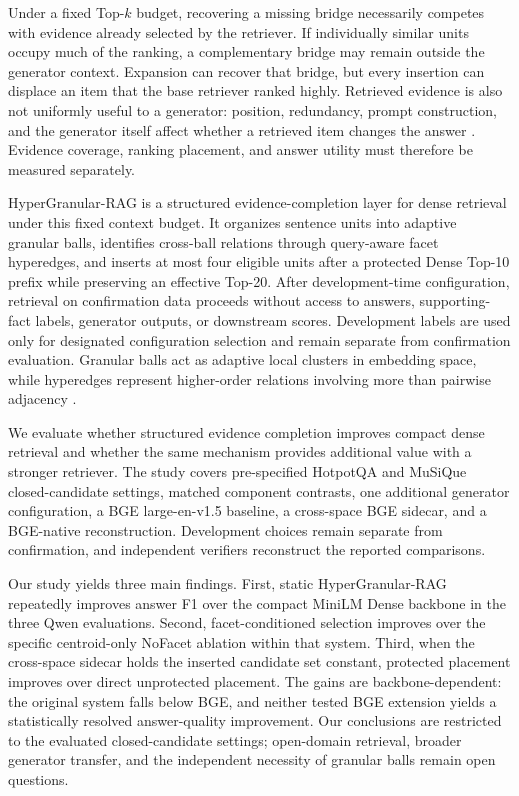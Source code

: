 \documentclass[11pt]{article}
\newcommand{\hgrag}{HyperGranular-RAG\xspace}
\begin{document}
Under a fixed Top-$k$ budget, recovering a missing bridge necessarily competes
with evidence already selected by the retriever. If individually similar units
occupy much of the ranking, a complementary bridge may remain outside the
generator context. Expansion can recover that bridge, but every insertion can
displace an item that the base retriever ranked highly.
Retrieved evidence is also not uniformly useful to a generator: position,
redundancy, prompt construction, and the generator itself affect whether a
retrieved item changes the answer \citep{liu2024lostmiddle,ram2023incontext}.
Evidence coverage, ranking placement, and answer utility must therefore be
measured separately.

\hgrag is a structured evidence-completion layer for dense retrieval under
this fixed context budget. It organizes sentence units into adaptive granular
balls, identifies cross-ball relations through query-aware facet hyperedges,
and inserts at most four eligible units after a protected Dense Top-10 prefix
while preserving an effective Top-20. After development-time configuration,
retrieval on confirmation data proceeds without access to answers,
supporting-fact labels, generator outputs, or downstream scores. Development
labels are used only for designated configuration selection and remain
separate from confirmation evaluation. Granular balls act as adaptive local
clusters in embedding space, while hyperedges represent higher-order relations
involving more than pairwise adjacency
\citep{xia2019granularball,feng2019hgnn}.

We evaluate whether structured evidence completion improves compact dense
retrieval and whether the same mechanism provides additional value with a
stronger retriever. The study covers pre-specified HotpotQA and MuSiQue
closed-candidate settings, matched component contrasts, one additional
generator configuration, a BGE large-en-v1.5 baseline, a cross-space BGE
sidecar, and a BGE-native reconstruction. Development choices remain separate
from confirmation, and independent verifiers reconstruct the reported
comparisons.

Our study yields three main findings. First, static \hgrag repeatedly improves
answer F1 over the compact MiniLM Dense backbone in the three Qwen evaluations.
Second, facet-conditioned selection improves over the specific centroid-only
NoFacet ablation within that system. Third, when the cross-space sidecar holds
the inserted candidate set constant, protected placement improves over direct
unprotected placement. The gains are backbone-dependent: the original system
falls below BGE, and neither tested BGE extension yields a statistically
resolved answer-quality improvement. Our conclusions are restricted to the
evaluated closed-candidate settings; open-domain retrieval, broader generator
transfer, and the independent necessity of granular balls remain open
questions.
\end{document}
